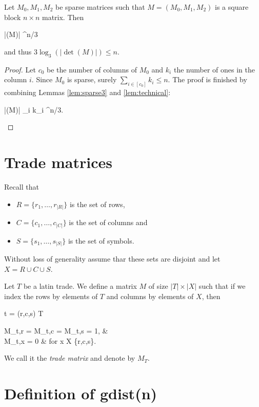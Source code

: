 \begin{lem}
Let $M_0,M_1,M_2$ be sparse matrices such that $M = (M_0,M_1,M_2)$ is a  square block $n \times n$ matrix. Then
\begin{cosyeqnarray}
 	|\det(M)| ^{n/3}
\end{cosyeqnarray}%
and thus $3 \log_3(|\det(M)|) \leq n$.
\end{lem}
\begin{proof}
Let $c_0$ be the number of columns of $M_0$ and $k_i$ the number of ones in the column $i$. Since $M_0$ is sparse, surely $\sum_{i \in [c_0]} k_i \leq n$. The proof is finished by combining Lemmas \ref{lem:sparse3} and \ref{lem:technical}:
\begin{cosyeqnarray}
	|\det(M)| \leq \prod_{i \in [c_0]} k_i ^{n/3}.
\end{cosyeqnarray}%
\end{proof}

\section{Trade matrices}
Recall that
\begin{itemize}
	\item $R = \{r_1,\dots,r_{|R|}\}$ is the set of rows,
	\item $C = \{c_1,\dots,c_{|C|}\}$ is the set of columns and
	\item $S = \{s_1,\dots,s_{|S|}\}$ is the set of symbols.
\end{itemize}
Without loss of generality assume thar these sets are disjoint and let $X = R \cup C \cup S$.

\begin{defn}
Let $T$ be a latin trade. We define a matrix $M$ of size $|T| \times |X|$ such that if we index the rows by elements of $T$ and columns by elements of $X$, then
\begin{cosyeqnarray}
	t = (r,c,s) \in T \Rightarrow
	\begin{cases}
		M_{t,r} = M_{t,c} = M_{t,s} = 1, & \\
		M_{t,x} = 0 & \textrm{ for } x \in X \setminus \{r,c,s\}.
	\end{cases}
\end{cosyeqnarray}%
\end{defn}
We call it the \emph{trade matrix} and denote by $M_T$.


\section{Definition of gdist(n)}

